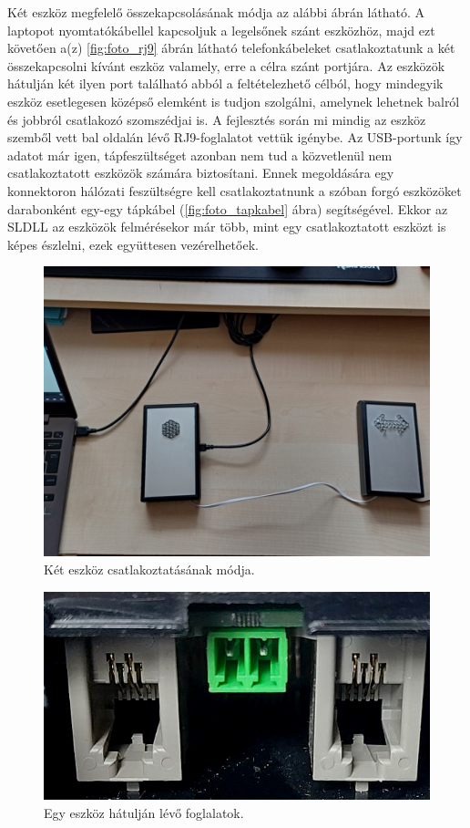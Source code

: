 \documentclass[tocnopagenum]{thesis-ekf}
\begin{document}
	Két eszköz megfelelő összekapcsolásának módja az alábbi ábrán látható. A laptopot nyomtatókábellel kapcsoljuk a legelsőnek szánt eszközhöz, majd ezt követően a(z) \ref{fig:foto_rj9} ábrán látható telefonkábeleket csatlakoztatunk a két összekapcsolni kívánt eszköz valamely, erre a célra szánt portjára. Az eszközök hátulján két ilyen port található abból a feltételezhető célból, hogy mindegyik eszköz esetlegesen középső elemként is tudjon szolgálni, amelynek lehetnek balról és jobbról csatlakozó szomszédjai is. A fejlesztés során mi mindig az eszköz szemből vett bal oldalán lévő RJ9-foglalatot vettük igénybe. Az USB-portunk így adatot már igen, tápfeszültséget azonban nem tud a közvetlenül nem csatlakoztatott eszközök számára biztosítani. Ennek megoldására egy konnektoron hálózati feszültségre kell csatlakoztatnunk a szóban forgó eszközöket darabonként egy-egy tápkábel (\ref{fig:foto_tapkabel} ábra) segítségével. 
	Ekkor az SLDLL az eszközök felmérésekor már több, mint egy csatlakoztatott eszközt is képes észlelni, ezek együttesen vezérelhetőek.
	\begin{figure}[H]
		\centering
		\includegraphics[scale=0.5]{images/foto_sorbakotes.jpg}
		\caption{Két eszköz csatlakoztatásának módja.}
		\label{fig:foto_sorbakotes}
	\end{figure}

	\begin{figure}[H]
	\centering
	\includegraphics[scale=0.35]{images/foto_foglalatok.jpg}
	\caption{Egy eszköz hátulján lévő foglalatok.}
	\label{fig:foto_foglalatok}
	\end{figure}
	
\end{document}
